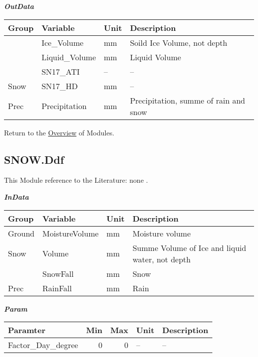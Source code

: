 \documentclass[
]{book}
\begin{document}
\textbf{\emph{OutData}}

\begin{table}[!h]
\centering
\begin{tabular}{l|l|l|l}
\hline
Group & Variable & Unit & Description\\
\hline
 & Ice\_Volume & mm & Soild Ice Volume, not depth\\
\cline{2-4}
 & Liquid\_Volume & mm & Liquid Volume\\
\cline{2-4}
 & SN17\_ATI & -- & --\\
\cline{2-4}
\multirow{-4}{*}{\raggedright\arraybackslash Snow} & SN17\_HD & mm & --\\
\cline{1-4}
Prec & Precipitation & mm & Precipitation, summe of rain and snow\\
\hline
\end{tabular}
\end{table}

Return to the \protect\hyperlink{module}{Overview} of Modules.

\hypertarget{SNOW.Ddf}{%
\subsection{SNOW.Ddf}\label{SNOW.Ddf}}

This Module reference to the Literature: none \citep{none}.

\textbf{\emph{InData}}

\begin{table}[!h]
\centering
\begin{tabular}{l|l|l|l}
\hline
Group & Variable & Unit & Description\\
\hline
Ground & MoistureVolume & mm & Moisture volume\\
\cline{1-4}
Snow & Volume & mm & Summe Volume of Ice and liquid water, not depth\\
\cline{1-4}
 & SnowFall & mm & Snow\\
\cline{2-4}
\multirow{-2}{*}{\raggedright\arraybackslash Prec} & RainFall & mm & Rain\\
\hline
\end{tabular}
\end{table}

\textbf{\emph{Param}}

\begin{table}[!h]
\centering
\begin{tabular}{l|r|r|l|l}
\hline
Paramter & Min & Max & Unit & Description\\
\hline
Factor\_Day\_degree & 0 & 0 & -- & --\\
\hline
\end{tabular}
\end{table}
\end{document}
